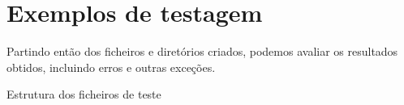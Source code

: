 \section{Exemplos de testagem}
\renewcommand{\listingscaption}{Comando}
Partindo então dos ficheiros e diretórios criados, podemos avaliar os resultados obtidos, incluindo erros e outras exceções.
\begin{listing}[H]
\centering
Estrutura dos ficheiros de teste
\end{listing}
